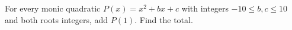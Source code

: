 For every monic quadratic $P(x)=x^2+bx+c$ with integers $-10\le b,c\le10$ and both roots integers, add $P(1)$. Find the total.
